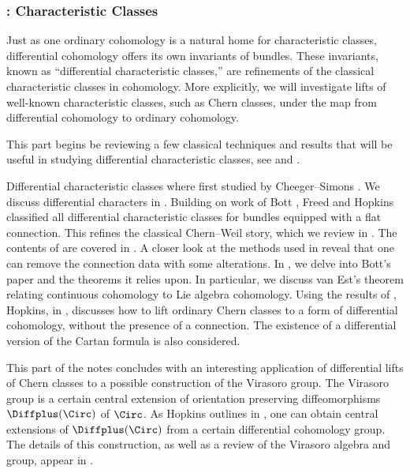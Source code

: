 \subsubsection{\texorpdfstring{}{Part \ref*{part:charclasses}}: Characteristic Classes}

Just as one ordinary cohomology is a natural home for characteristic classes, differential cohomology offers its own invariants of bundles. These invariants, known as ``differential characteristic classes,'' are refinements of the classical characteristic classes in cohomology. More explicitly, we will investigate lifts of well-known characteristic classes, such as Chern classes, under the map from differential cohomology to ordinary cohomology.

This part begins be reviewing a few classical techniques and results that will be useful in studying differential characteristic classes, see  and .

Differential characteristic classes where first studied by Cheeger--Simons \cite{Cheeger-Simons}. %
We discuss differential characters in . 
Building on work of Bott \cite{BottPaper}, Freed and Hopkins \cite{FreedHopkins} classified all differential characteristic classes for bundles equipped with a flat connection. 
This refines the classical Chern--Weil story, which we review in . 
The contents of \cite{FreedHopkins} are covered in .  
A closer look at the methods used in \cite{BottPaper} reveal that one can remove the connection data with some alterations. 
In , we delve into Bott's paper and the theorems it relies upon. In particular, we discuss van Est's theorem relating continuous cohomology to Lie algebra cohomology. 
Using the results of \cite{BottPaper}, Hopkins, in , discusses how to lift ordinary Chern classes to a form of differential cohomology, without the presence of a connection. 
The existence of a differential version of the Cartan formula is also considered. 

This part of the notes concludes with an interesting application of differential lifts of Chern classes to a possible construction of the Virasoro group. The Virasoro group is a certain central extension of orientation preserving diffeomorphisms $\Diffplus(\Circ)$ of $\Circ$. As Hopkins outlines in , one can obtain central extensions of $\Diffplus(\Circ)$ from a certain differential cohomology group. The details of this construction, as well as a review of the Virasoro algebra and group, appear in .

